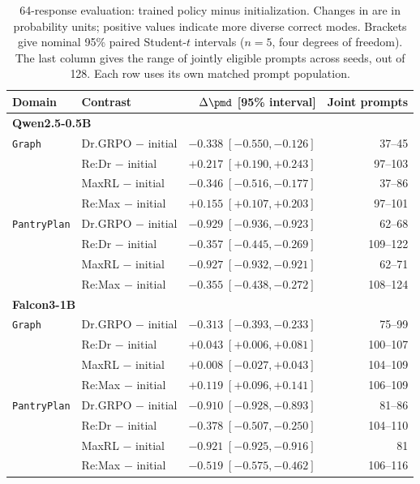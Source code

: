 \begin{table}[t]
\centering
\small
\setlength{\tabcolsep}{4pt}
\caption{64-response evaluation: trained policy minus initialization. Changes in \pmd{} are in probability units; positive values indicate more diverse correct modes. Brackets give nominal 95\% paired Student-$t$ intervals ($n=5$, four degrees of freedom). The last column gives the range of jointly eligible prompts across seeds, out of 128. Each row uses its own matched prompt population.}
\label{tab:fresh-concentration-initial}
\begin{tabular}{llrr}
\toprule
Domain & Contrast & $\Delta\pmd$ [95\% interval] & Joint prompts \\
\midrule
\multicolumn{4}{l}{\textbf{Qwen2.5-0.5B}} \\
\texttt{Graph} & Dr.GRPO $-$ initial & $-0.338\;[-0.550, -0.126]$ & 37--45 \\
 & Re:Dr $-$ initial & $+0.217\;[+0.190, +0.243]$ & 97--103 \\
 & MaxRL $-$ initial & $-0.346\;[-0.516, -0.177]$ & 37--86 \\
 & Re:Max $-$ initial & $+0.155\;[+0.107, +0.203]$ & 97--101 \\
\texttt{PantryPlan} & Dr.GRPO $-$ initial & $-0.929\;[-0.936, -0.923]$ & 62--68 \\
 & Re:Dr $-$ initial & $-0.357\;[-0.445, -0.269]$ & 109--122 \\
 & MaxRL $-$ initial & $-0.927\;[-0.932, -0.921]$ & 62--71 \\
 & Re:Max $-$ initial & $-0.355\;[-0.438, -0.272]$ & 108--124 \\
\midrule
\multicolumn{4}{l}{\textbf{Falcon3-1B}} \\
\texttt{Graph} & Dr.GRPO $-$ initial & $-0.313\;[-0.393, -0.233]$ & 75--99 \\
 & Re:Dr $-$ initial & $+0.043\;[+0.006, +0.081]$ & 100--107 \\
 & MaxRL $-$ initial & $+0.008\;[-0.027, +0.043]$ & 104--109 \\
 & Re:Max $-$ initial & $+0.119\;[+0.096, +0.141]$ & 106--109 \\
\texttt{PantryPlan} & Dr.GRPO $-$ initial & $-0.910\;[-0.928, -0.893]$ & 81--86 \\
 & Re:Dr $-$ initial & $-0.378\;[-0.507, -0.250]$ & 104--110 \\
 & MaxRL $-$ initial & $-0.921\;[-0.925, -0.916]$ & 81 \\
 & Re:Max $-$ initial & $-0.519\;[-0.575, -0.462]$ & 106--116 \\

\end{tabular}
\end{table}
